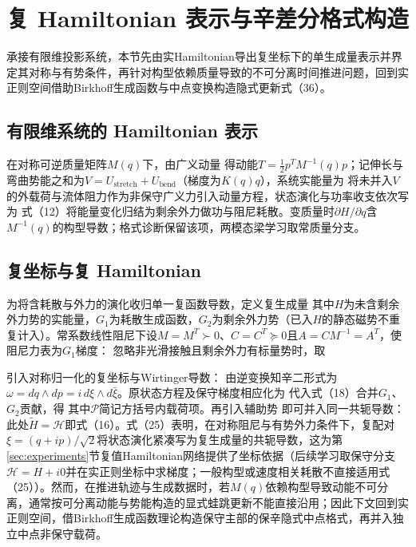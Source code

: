 \section{复 Hamiltonian 表示与辛差分格式构造}
\label{sec:fixed_method}

承接有限维投影系统，本节先由实Hamiltonian导出复坐标下的单生成量表示并界定其对称与有势条件，再针对构型依赖质量导致的不可分离时间推进问题，回到实正则空间借助Birkhoff生成函数与中点变换构造隐式更新式（36）。

\subsection{有限维系统的 Hamiltonian 表示}

在对称可逆质量矩阵$M(q)$下，由广义动量
得动能$T=\tfrac12p^TM^{-1}(q)p$；记伸长与弯曲势能之和为$V=U_{\mathrm{stretch}}+U_{\mathrm{bend}}$（梯度为$K(q)q$），系统实能量为
将未并入$V$的外载荷与流体阻力作为非保守广义力引入动量方程，状态演化与功率收支依次写为
式（12）将能量变化归结为剩余外力做功与阻尼耗散。变质量时$\partial H/\partial q$含$M^{-1}(q)$的构型导数；格式诊断保留该项，两模态梁学习取常质量分支。

\subsection{复坐标与复 Hamiltonian}

为将含耗散与外力的演化收归单一复函数导数，定义复生成量
其中$H$为未含剩余外力势的实能量，$G_1$为耗散生成函数，$G_2$为剩余外力势（已入$H$的静态磁势不重复计入）。常系数线性阻尼下设$M=M^T\succ0$、$C=C^T\succeq0$且$A=CM^{-1}=A^T$，使阻尼力表为$G_1$梯度：
忽略非光滑接触且剩余外力有标量势时，取

引入对称归一化的复坐标与Wirtinger导数：
由逆变换知辛二形式为$\omega=dq\wedge dp=i\,d\xi\wedge d\bar\xi$。原状态方程及保守梯度相应化为
代入式（18）合并$G_1$、$G_2$贡献，得
其中$\mathcal P$简记方括号内载荷项。再引入辅助势
即可并入同一共轭导数：
此处$\widetilde H=\mathcal H$即式（16）。式（25）表明，在对称阻尼与有势外力条件下，复配对$\xi=(q+ip)/\sqrt2$将状态演化紧凑写为复生成量的共轭导数，这为第\ref{sec:experiments}节复值Hamiltonian网络提供了坐标依据（后续学习取保守分支$\mathcal H=H+i0$并在实正则坐标中求梯度；一般构型或速度相关耗散不直接适用式（25））。然而，在推进轨迹与生成数据时，若$M(q)$依赖构型导致动能不可分离，通常按可分离动能与势能构造的显式蛙跳更新不能直接沿用；因此下文回到实正则空间，借Birkhoff生成函数理论构造保守主部的保辛隐式中点格式，再并入独立中点非保守载荷。

